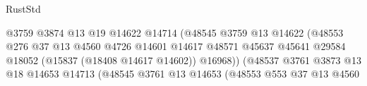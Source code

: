 \begin{lexlean}{RustStd}
\begin{coremodule}
                                                      @3759
                                                      @3874
                                                      @13
                                                      @19
                                                      @14622
                                                      @14714
                                                      (@48545
                                                        @3759
                                                        @13
                                                        @14622
                                                        (@48553
                                                          @276
                                                          @37
                                                          @13
                                                          @4560
                                                          @4726
                                                          @14601
                                                          @14617
                                                          @48571
                                                          @45637
                                                          @45641
                                                          @29584
                                                          @18052
                                                          (@15837 (@18408 @14617 @14602))
                                                          @16968))
                                                      (@48537
                                                        @3761
                                                        @3873
                                                        @13
                                                        @18
                                                        @14653
                                                        @14713
                                                        (@48545
                                                          @3761
                                                          @13
                                                          @14653
                                                          (@48553
                                                            @553
                                                            @37
                                                            @13
                                                            @4560

\end{coremodule}
\end{lexlean}
